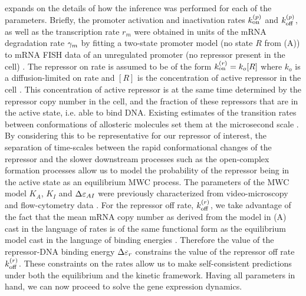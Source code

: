  expands on the details of how the inference was
performed for each of the parameters. Briefly, the promoter activation and
inactivation rates $k^{(p)}_{\text{on}}$ and $k^{(p)}_{\text{off}}$, as well as the transcription rate
$r_m$ were obtained in units of the mRNA degradation rate $\gamma _m$ by fitting a
two-state promoter model (no state $R$ from (A))
\cite{Peccoud1995} to mRNA FISH data of an unregulated promoter (no  repressor
present in the cell) \cite{Jones2014a}. The repressor on rate is assumed to be
of the form $k^{(r)}_{\text{on}} = k_o [R]$ where $k_o$ is a diffusion-limited on rate and
$[R]$ is the concentration of active repressor in the cell \cite{Jones2014a}.
This concentration of active repressor is at the same time determined by the
repressor copy number in the cell, and the fraction of these repressors  that
are in the active state, i.e. able to bind DNA. Existing estimates of the
transition rates between conformations of allosteric molecules set them at the
microsecond scale \cite{Cui2008}. By considering this to be representative for
our repressor of interest, the separation of time-scales between the rapid
conformational changes of the repressor and the slower downstream processes
such as the open-complex formation processes allow us to model the probability
of the repressor being in the active state as an equilibrium MWC process. The
parameters of the MWC model $K_A$, $K_I$ and $\Delta\varepsilon_{AI}$ were previously
characterized from video-microscopy and flow-cytometry data
\cite{Razo-Mejia2018}. For the repressor off rate, $k^{(r)}_{\text{off}}$, we take advantage
of the fact that the mean mRNA copy number as derived from the model in
(A) cast in the language of rates is of the same
functional form as the equilibrium model cast in the language of binding
energies \cite{Phillips2015}. Therefore the value of the repressor-DNA binding
energy $\Delta\varepsilon_r$ constrains the value of the repressor off rate $k^{(r)}_{\text{off}}$. These
constraints on the rates allow us to make self-consistent predictions under
both the equilibrium and the kinetic framework. Having all parameters in hand,
we can now proceed to solve the gene expression dynamics.

